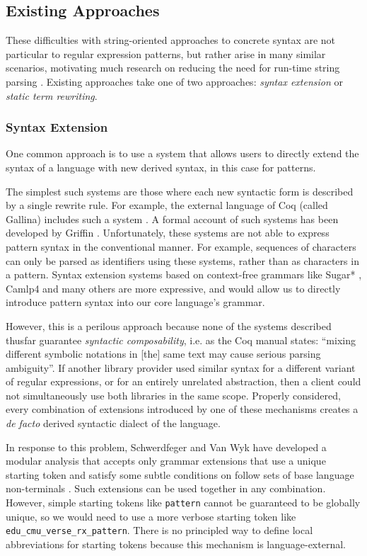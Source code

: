 \subsection{Existing Approaches}\label{sec:syntax-existing} These difficulties with string-oriented approaches to concrete syntax are not particular to regular expression patterns, but rather arise in many similar scenarios, motivating much research on reducing the need for run-time string parsing \cite{Bravenboer:2007:PIA:1289971.1289975}. Existing approaches take one of two approaches: \emph{syntax extension} or \emph{static term rewriting}. 

\subsubsection{Syntax Extension}
One common approach is to use a system that allows users to directly extend the syntax of a language with new derived syntax, in this case for patterns.

The simplest such systems are those where each new syntactic form is described by a single rewrite rule. For example, the external language of Coq (called Gallina) includes such a system \cite{Coq:manual}. A formal account of such systems has been developed by Griffin \cite{5134}. Unfortunately, these systems are not able to express pattern syntax in the conventional manner. For example, sequences of characters  can only be parsed as identifiers using these systems, rather than as characters in a pattern. Syntax extension systems based on context-free grammars like  Sugar* \cite{erdweg2013framework}, Camlp4 \cite{ocaml-manual} and many others are more expressive, and would allow us to directly introduce pattern syntax into our core language's grammar.

However, this is a perilous approach because none of the systems described thusfar guarantee \emph{syntactic composability}, i.e. as the Coq manual states: ``mixing different symbolic notations in [the] same text may cause serious parsing ambiguity''. If another library provider used similar syntax for a different variant of regular expressions, or for an entirely unrelated abstraction, then a client could not simultaneously use both libraries in the same scope. Properly considered, every combination of extensions introduced by one of these mechanisms creates a \emph{de facto} derived syntactic dialect of the language. %

In response to this problem, Schwerdfeger and Van Wyk have developed a modular analysis that accepts only grammar extensions that use a unique starting token and satisfy some subtle conditions on follow sets of base language non-terminals \cite{conf/pldi/SchwerdfegerW09}. Such extensions can be used together in any combination. However, simple starting tokens like \lstinline{pattern} cannot be guaranteed to be globally unique, so we would need to use a more verbose starting token like \lstinline{edu_cmu_verse_rx_pattern}. There is no principled way to define local abbreviations for starting tokens because this mechanism is language-external.

